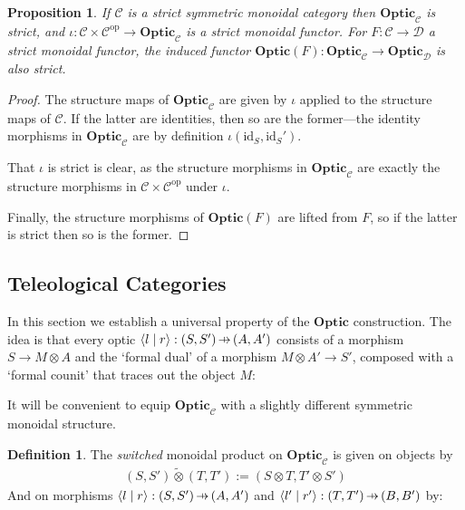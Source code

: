 \documentclass[11pt,letterpaper]{article}
\theoremstyle{plain}
\newtheorem{proposition}[theorem]{Proposition}
\theoremstyle{definition}
\newtheorem{definition}[theorem]{Definition}
\newcommand{\C}{\mathscr{C}}
\newcommand{\D}{\mathscr{D}}
\newcommand{\Optic}{\mathbf{Optic}}
\newcommand{\switched}{\mathbin{\tilde{\otimes}}}
\newcommand{\id}{\mathrm{id}}
\newcommand{\op}{\mathrm{op}}
\newcommand{\rep}[2]{{\ensuremath \left\langle #1 \mid #2 \right\rangle}}
\newcommand{\hto}{\ensuremath{\,\mathaccent\shortmid\rightarrow\,}}
\begin{document}
\begin{proposition}
  If $\C$ is a strict symmetric monoidal category then $\Optic_\C$ is strict, and $\iota : \C \times \C^\op \to \Optic_\C$ is a strict monoidal functor. For $F : \C \to \D$ a strict monoidal functor, the induced functor $\Optic(F) : \Optic_\C \to \Optic_\D$ is also strict.
\end{proposition}
\begin{proof}
  The structure maps of $\Optic_\C$ are given by $\iota$ applied to the structure maps of $\C$. If the latter are identities, then so are the former---the identity morphisms in $\Optic_\C$ are by definition $\iota(\id_S, \id_S')$.

  That $\iota$ is strict is clear, as the structure morphisms in $\Optic_\C$ are exactly the structure morphisms in $\C \times \C^\op$ under $\iota$. 
  
  Finally, the structure morphisms of $\Optic(F)$ are lifted from $F$, so if the latter is strict then so is the former.
\end{proof}

\subsection{Teleological Categories}\label{sec:teleological-categories}
In this section we establish a universal property of the $\Optic$ construction. The idea is that every optic $\rep{l}{r} : (S, S') \hto (A, A')$ consists of a morphism $S \to M \otimes A$ and the `formal dual' of a morphism $M \otimes A' \to S'$, composed with a `formal counit' that traces out the object $M$:
\begin{center}
  
\end{center}

It will be convenient to equip $\Optic_\C$ with a slightly different symmetric monoidal structure.

\begin{definition}
  The \emph{switched} monoidal product on $\Optic_\C$ is given on objects by
  \begin{align*}
    (S, S') \switched (T, T') := (S \otimes T, T' \otimes S')
  \end{align*}
  And on morphisms $\rep{l}{r} : (S, S') \hto (A, A')$ and $\rep{l'}{r'} : (T, T') \hto (B, B')$ by:
  \begin{center}
    
  \end{center}
\end{definition}
\end{document}
